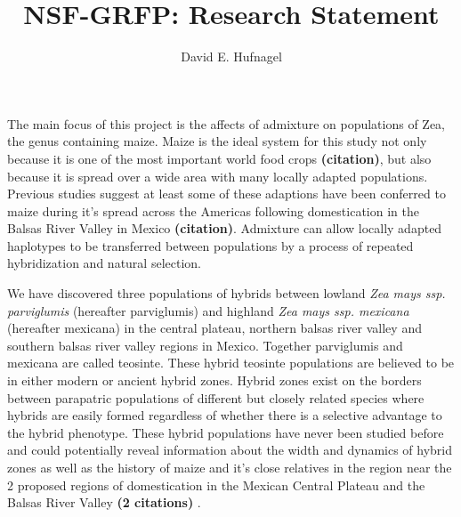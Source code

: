\documentclass[12pt]{amsart}
\title{NSF-GRFP: Research Statement}
\author{David E. Hufnagel}
\begin{document}
\maketitle

The main focus of this project is the affects of admixture on populations of Zea, the genus containing maize.  
Maize is the ideal system for this study not only because it is one of the most important world food crops \textbf{(citation)}, but also because it is spread over a wide area with many locally adapted populations.  
Previous studies suggest at least some of these adaptions have been conferred to maize during it's spread across the Americas following domestication in the Balsas River Valley in Mexico \textbf{(citation)}.  
Admixture can allow locally adapted haplotypes to be transferred between populations by a process of repeated hybridization and natural selection.


We have discovered three populations of hybrids between lowland \textit{Zea mays ssp. parviglumis} (hereafter parviglumis) and highland \textit{Zea mays ssp. mexicana} (hereafter mexicana) in the central plateau, northern balsas river valley and southern balsas river valley regions in Mexico.  
Together parviglumis and mexicana are called teosinte.
These hybrid teosinte populations are believed to be in either modern or ancient hybrid zones.  
Hybrid zones exist on the borders between parapatric populations of different but closely related species where hybrids are easily formed regardless of whether there is a selective advantage to the hybrid phenotype.
These hybrid populations have never been studied before and could potentially reveal information about the width and dynamics of hybrid zones as well as the history of maize and it's close relatives in the region near the 2 proposed regions of domestication in the Mexican Central Plateau and the Balsas River Valley \textbf{(2 citations)} .
\end{document}

